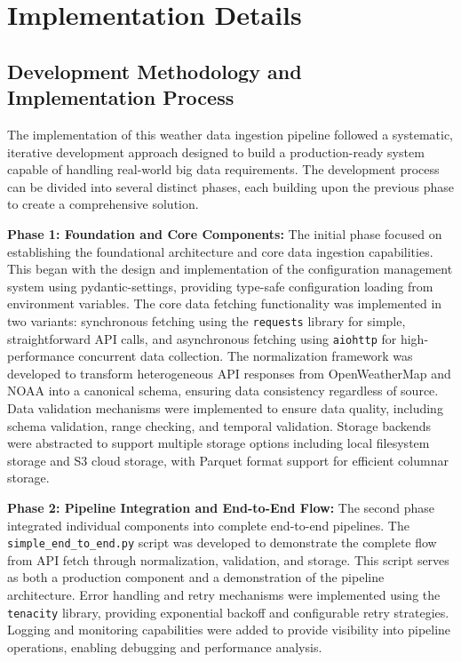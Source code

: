 \documentclass[12pt,a4paper]{article}
\begin{document}
\newpage
\section{Implementation Details}

\subsection{Development Methodology and Implementation Process}

The implementation of this weather data ingestion pipeline followed a systematic, iterative development approach designed to build a production-ready system capable of handling real-world big data requirements. The development process can be divided into several distinct phases, each building upon the previous phase to create a comprehensive solution.

\textbf{Phase 1: Foundation and Core Components:} The initial phase focused on establishing the foundational architecture and core data ingestion capabilities. This began with the design and implementation of the configuration management system using pydantic-settings, providing type-safe configuration loading from environment variables. The core data fetching functionality was implemented in two variants: synchronous fetching using the \texttt{requests} library for simple, straightforward API calls, and asynchronous fetching using \texttt{aiohttp} for high-performance concurrent data collection. The normalization framework was developed to transform heterogeneous API responses from OpenWeatherMap and NOAA into a canonical schema, ensuring data consistency regardless of source. Data validation mechanisms were implemented to ensure data quality, including schema validation, range checking, and temporal validation. Storage backends were abstracted to support multiple storage options including local filesystem storage and S3 cloud storage, with Parquet format support for efficient columnar storage.

\textbf{Phase 2: Pipeline Integration and End-to-End Flow:} The second phase integrated individual components into complete end-to-end pipelines. The \texttt{simple\_end\_to\_end.py} script was developed to demonstrate the complete flow from API fetch through normalization, validation, and storage. This script serves as both a production component and a demonstration of the pipeline architecture. Error handling and retry mechanisms were implemented using the \texttt{tenacity} library, providing exponential backoff and configurable retry strategies. Logging and monitoring capabilities were added to provide visibility into pipeline operations, enabling debugging and performance analysis.
\end{document}
